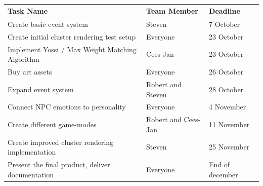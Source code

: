 \documentclass[11pt]{article} %
\begin{document}
~\\
\begin{tabular}{|  l | l | l | }
  \hline			
  Task Name & Team Member & Deadline  \\ \hline
  Create basic event system & Steven & 7 October \\ \hline 
  Create initial cluster rendering test setup & Everyone & 23 October \\ \hline 
  Implement Yossi / Max Weight Matching Algorithm & Cees-Jan & 23 October \\ \hline
  Buy  art assets & Everyone & 26 October \\ \hline 
  Expand event system & Robert and Steven & 28 October \\ \hline  
  Connect NPC emotions to personality & Everyone & 4 November \\ \hline
  Create different game-modes & Robert and Cees-Jan & 11 November \\ \hline
  Create improved cluster rendering implementation & Steven & 25 November \\ \hline  
  Present the final product, deliver documentation & Everyone & End of december \\ \hline
\end{tabular}


%
%
%
%
%
%
%
%
%
%
%
%
%
%
%
%
%
%
%
%
%
%
\end{document}
